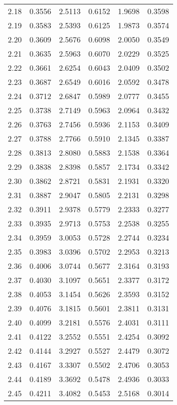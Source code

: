 \documentclass{article}
\begin{document}
\begin{longtable}{cccccc}
2.18 & 0.3556 & 2.5113 & 0.6152 & 1.9698 & 0.3598 \\
2.19 & 0.3583 & 2.5393 & 0.6125 & 1.9873 & 0.3574 \\
2.20 & 0.3609 & 2.5676 & 0.6098 & 2.0050 & 0.3549 \\
2.21 & 0.3635 & 2.5963 & 0.6070 & 2.0229 & 0.3525 \\
2.22 & 0.3661 & 2.6254 & 0.6043 & 2.0409 & 0.3502 \\
2.23 & 0.3687 & 2.6549 & 0.6016 & 2.0592 & 0.3478 \\
2.24 & 0.3712 & 2.6847 & 0.5989 & 2.0777 & 0.3455 \\
2.25 & 0.3738 & 2.7149 & 0.5963 & 2.0964 & 0.3432 \\
2.26 & 0.3763 & 2.7456 & 0.5936 & 2.1153 & 0.3409 \\
2.27 & 0.3788 & 2.7766 & 0.5910 & 2.1345 & 0.3387 \\
2.28 & 0.3813 & 2.8080 & 0.5883 & 2.1538 & 0.3364 \\
2.29 & 0.3838 & 2.8398 & 0.5857 & 2.1734 & 0.3342 \\
2.30 & 0.3862 & 2.8721 & 0.5831 & 2.1931 & 0.3320 \\
2.31 & 0.3887 & 2.9047 & 0.5805 & 2.2131 & 0.3298 \\
2.32 & 0.3911 & 2.9378 & 0.5779 & 2.2333 & 0.3277 \\
2.33 & 0.3935 & 2.9713 & 0.5753 & 2.2538 & 0.3255 \\
2.34 & 0.3959 & 3.0053 & 0.5728 & 2.2744 & 0.3234 \\
2.35 & 0.3983 & 3.0396 & 0.5702 & 2.2953 & 0.3213 \\
2.36 & 0.4006 & 3.0744 & 0.5677 & 2.3164 & 0.3193 \\
2.37 & 0.4030 & 3.1097 & 0.5651 & 2.3377 & 0.3172 \\
2.38 & 0.4053 & 3.1454 & 0.5626 & 2.3593 & 0.3152 \\
2.39 & 0.4076 & 3.1815 & 0.5601 & 2.3811 & 0.3131 \\
2.40 & 0.4099 & 3.2181 & 0.5576 & 2.4031 & 0.3111 \\
2.41 & 0.4122 & 3.2552 & 0.5551 & 2.4254 & 0.3092 \\
2.42 & 0.4144 & 3.2927 & 0.5527 & 2.4479 & 0.3072 \\
2.43 & 0.4167 & 3.3307 & 0.5502 & 2.4706 & 0.3053 \\
2.44 & 0.4189 & 3.3692 & 0.5478 & 2.4936 & 0.3033 \\
2.45 & 0.4211 & 3.4082 & 0.5453 & 2.5168 & 0.3014 \\

\end{longtable}
\end{document}
